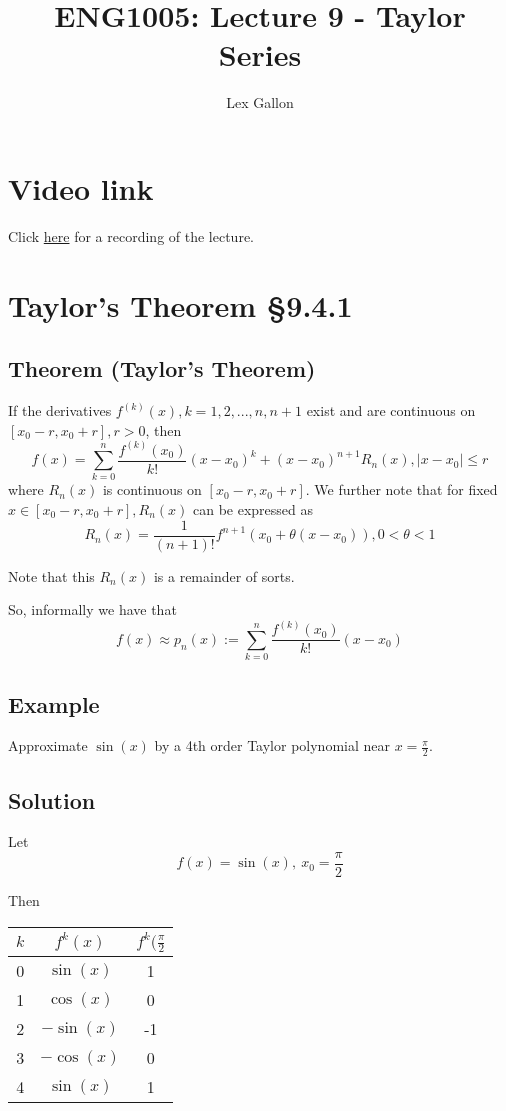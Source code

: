 \documentclass[11pt]{article}
\begin{document}
\title{ENG1005: Lecture 9 - Taylor Series}
\author{Lex Gallon}
\maketitle

\tableofcontents

\section*{Video link}
Click \href{https://echo360.org.au/lesson/G_35fe23e0-41ee-4e6f-b0f5-05f4155bb7b0_b944cecf-8ba5-40d3-a870-0243a0a9e78c_2020-04-02T15:58:00.000_2020-04-02T16:53:00.000/classroom#sortDirection=desc}{here} for a recording of the lecture.

\section{Taylor's Theorem §9.4.1}
\subsection{Theorem (Taylor's Theorem)}
If the derivatives $f^{(k)}(x), k=1,2,...,n, n+1$ exist and are continuous on $[x_0 - r, x_0 + r], r>0$, then
\[ f(x) = \sum_{k=0}^n \frac{f^{(k)}(x_0)}{k!} (x-x_0)^k + (x-x_0)^{n+1} R_n(x), |x-x_0| \leq r \]
where $R_n(x)$ is continuous on $[x_0 - r, x_0 + r]$. We further note that for fixed $x \in [x_0 - r, x_0 + r], R_n(x)$ can be expressed as
\[ R_n(x) = \frac{1}{(n+1)!} f^{n+1} (x_0 + \theta(x-x_0)), 0 <\theta < 1 \]

Note that this $R_n(x)$ is a remainder of sorts.

So, informally we have that
\[ f(x) \approx p_n(x) := \sum_{k=0}^n \frac{f^{(k)}(x_0)}{k!} (x-x_0)  \]

\subsection{Example}
Approximate $\sin(x)$ by a 4th order Taylor polynomial near $x = \frac{\pi}{2}$.

\subsection{Solution}
Let
\[ f(x) = \sin(x),\ x_0=\frac{\pi}{2} \]

Then

\begin{tabular}{| c | c | c |}
\hline
$k$ & $f^k(x)$ & $f^k(\frac{\pi}{2}$ \\
\hline
0 & $\sin(x)$ & 1 \\
1 & $\cos(x)$ & 0 \\
2 & $-\sin(x)$ & -1 \\
3 & $-\cos(x)$ & 0 \\
4 & $\sin(x)$ & 1 \\
\hline
\end{tabular}
\end{document}

